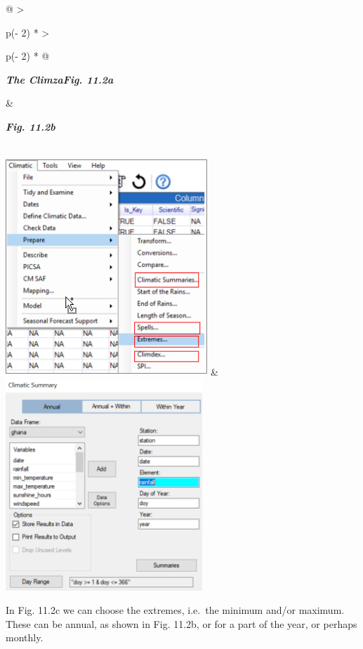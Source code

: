 \documentclass[
  letterpaper,
  DIV=11,
  numbers=noendperiod]{scrreprt}
\begin{document}
\begin{longtable}[]{@{}
  >{\raggedright\arraybackslash}p{(\columnwidth - 2\tabcolsep) * }
  >{\raggedright\arraybackslash}p{(\columnwidth - 2\tabcolsep) * }@{}}
\toprule\noalign{}
\begin{minipage}[b]{\linewidth}\raggedright
\textbf{\emph{The ClimzaFig. 11.2a}}
\end{minipage} & \begin{minipage}[b]{\linewidth}\raggedright
\textbf{\emph{Fig. 11.2b}}
\end{minipage} \\
\midrule\noalign{}
\endhead
\bottomrule\noalign{}
\endlastfoot
\includegraphics[width=2.99269in,height=3.23755in]{figures/Fig11.2a.png}
&
\includegraphics[width=2.91342in,height=3.13521in]{figures/Fig11.2b.png} \\
\end{longtable}

In Fig. 11.2c we can choose the extremes, i.e.~the minimum and/or
maximum. These can be annual, as shown in Fig. 11.2b, or for a part of
the year, or perhaps monthly.
\end{document}
